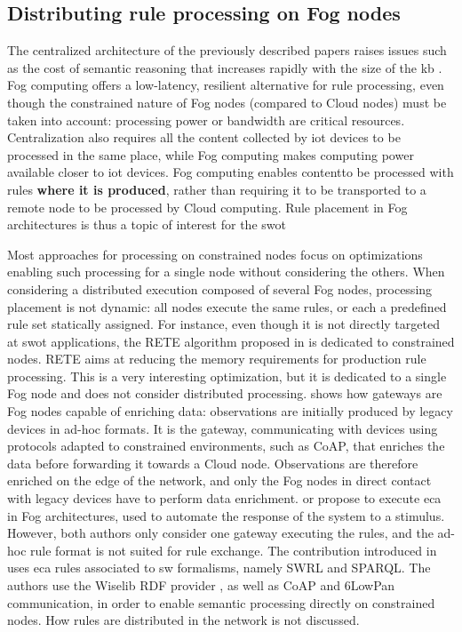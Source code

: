 \documentclass{iosart2c}
\begin{document}
\subsection{Distributing rule processing on Fog nodes}

The centralized architecture of the previously described papers raises issues such as the cost of semantic reasoning that increases rapidly with the size of the \gls{kb} \cite{Maarala2017}.
Fog computing offers a low-latency, resilient alternative for rule processing, even though the constrained nature of Fog nodes (compared to Cloud nodes) must be taken into account: processing power or bandwidth are critical resources.
Centralization also requires all the content collected by \gls{iot} devices to be processed in the same place, while Fog computing makes computing power available closer to \gls{iot} devices.
Fog computing enables contentto be processed with rules \textbf{where it is produced}, rather than requiring it to be transported to a remote node to be processed by Cloud computing.
Rule placement in Fog architectures is thus a topic of interest for the \gls{swot}

Most approaches for processing on constrained nodes focus on optimizations enabling such processing for a single node without considering the others.
When considering a distributed execution composed of several Fog nodes, processing placement is not dynamic: all nodes execute the same rules, or each a predefined rule set statically assigned.
For instance, even though it is not directly targeted at \gls{swot} applications, the RETE algorithm proposed in \cite{Woensel2018} is dedicated to constrained nodes.
RETE aims at reducing the memory requirements for production rule processing.
This is a very interesting optimization, but it is dedicated to a single Fog node and does not consider distributed processing.
\cite{Desai2015} shows how gateways are Fog nodes capable of enriching data: observations are initially produced by legacy devices in ad-hoc formats. 
It is the gateway, communicating with devices using protocols adapted to constrained environments, such as CoAP, that enriches the data before forwarding it towards a Cloud node. 
Observations are therefore enriched on the edge of the network, and only the Fog nodes in direct contact with legacy devices have to perform data enrichment.
\cite{Lee2016} or \cite{KaedKBHS18} propose to execute \gls{eca} in Fog architectures, used to automate the response of the system to a stimulus. 
However, both authors only consider one gateway executing the rules, and the ad-hoc rule format is not suited for rule exchange.
The contribution introduced in \cite{IoannisChatzigiannakis129} uses \gls{eca} rules associated to \gls{sw} formalisms, namely SWRL and SPARQL.
The authors use the Wiselib RDF provider \cite{Hasemann2012}, as well as CoAP and 6LowPan communication, in order to enable semantic processing directly on constrained nodes.
How rules are distributed in the network is not discussed.
\end{document}
